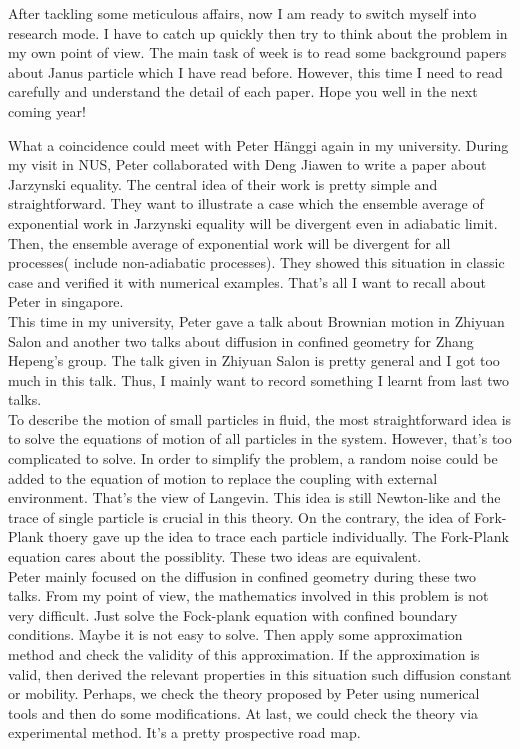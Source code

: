 \documentclass[fontsize=11pt, %
                             paper=a4, %
                             twoside, %
                             captions=tableheading,
                             index=totoc,
                             hyperref]{labbook}
\begin{document}
\begin{addmargin}[4cm]{0cm}
After tackling some meticulous affairs, now I am ready to switch myself into research mode. I have to catch up quickly then try to think about the problem in my own point of view. The main task of week is to read some background papers\cite{ChiangVelegol2014,Fixman1980,KlineIwataLammertEtAl2006,OBrienWhite1978,RobertJ.HunterRowell1981,Teubner1982} about Janus particle which I have read before. However, this time I need to read carefully and understand the detail of each paper. Hope you well in the next coming year!

What a coincidence could meet with Peter H{\"a}nggi again in my university. During my visit in NUS, Peter collaborated with Deng Jiawen to write a paper about Jarzynski equality\cite{Jarzynski1997a}. The central idea of their work is pretty simple and straightforward. They want to illustrate a case which the ensemble average of exponential work in Jarzynski equality will be divergent even in adiabatic limit. Then, the ensemble average of exponential work will be divergent for all processes( include non-adiabatic processes). They showed this situation in classic case and verified it with numerical examples. That's all I want to recall about Peter in singapore. \\
This time in my university, Peter gave a talk about Brownian motion in Zhiyuan Salon and another two talks about diffusion in confined geometry \cite{burada2009diffusion} for Zhang Hepeng's group. The talk given in Zhiyuan Salon is pretty general and I got too much in this talk. Thus, I mainly want to record something I learnt from last two talks.\\
To describe the motion of small particles in fluid, the most straightforward idea is to solve the equations of motion of all particles in the system. However, that's too complicated to solve. In order to simplify the problem, a random noise could be added to the equation of motion to replace the coupling with external environment. That's the view of Langevin. This idea is still Newton-like and the trace of single particle is crucial in this theory. On the contrary, the idea of Fork-Plank thoery gave up the idea to trace each particle individually. The Fork-Plank equation cares about the possiblity. These two ideas are equivalent.\\
Peter mainly focused on the diffusion in confined geometry during these two talks. From my point of view, the mathematics involved in this problem is not very difficult. Just solve the Fock-plank equation with confined boundary conditions. Maybe it is not easy to solve. Then apply some approximation method and check the validity of this approximation. If the approximation is valid, then derived the relevant properties in this situation such diffusion constant or mobility. Perhaps, we check the theory proposed by Peter using numerical tools and then do some modifications. At last, we could check the theory via experimental method. It's a pretty prospective road map. \\

\end{addmargin}
\end{document}
